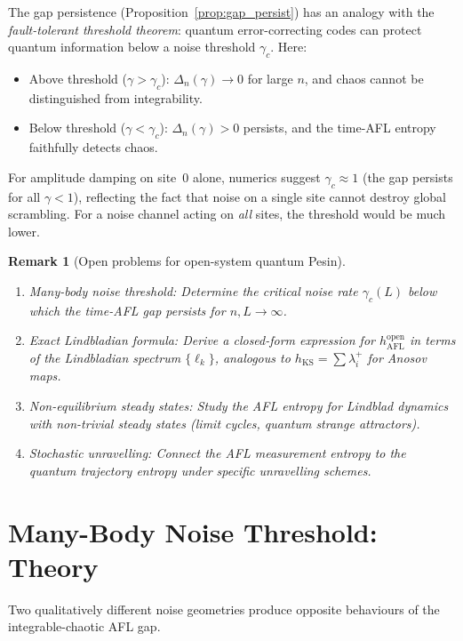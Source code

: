 \documentclass[12pt,a4paper]{article}
\newtheorem{remark}[theorem]{Remark}
\begin{document}
The gap persistence (Proposition~\ref{prop:gap_persist}) has an analogy
with the \emph{fault-tolerant threshold theorem}: quantum error-correcting
codes can protect quantum information below a noise threshold $\gamma_c$.
Here:
\begin{itemize}
\item Above threshold ($\gamma>\gamma_c$): $\Delta_n(\gamma)\to 0$ for large
  $n$, and chaos cannot be distinguished from integrability.
\item Below threshold ($\gamma<\gamma_c$): $\Delta_n(\gamma)>0$ persists,
  and the time-AFL entropy faithfully detects chaos.
\end{itemize}
For amplitude damping on site~$0$ alone, numerics suggest $\gamma_c\approx 1$
(the gap persists for all $\gamma<1$), reflecting the fact that noise on
a single site cannot destroy global scrambling.  For a noise channel acting
on \emph{all} sites, the threshold would be much lower.

\begin{remark}[Open problems for open-system quantum Pesin]
\begin{enumerate}
\item \emph{Many-body noise threshold:} Determine the critical noise rate
  $\gamma_c(L)$ below which the time-AFL gap persists for $n,L\to\infty$.
\item \emph{Exact Lindbladian formula:} Derive a closed-form expression for
  $h_{\mathrm{AFL}}^{\mathrm{open}}$ in terms of the Lindbladian spectrum
  $\{\ell_k\}$, analogous to $h_{\mathrm{KS}}=\sum\lambda_i^+$ for Anosov maps.
\item \emph{Non-equilibrium steady states:} Study the AFL entropy for
  Lindblad dynamics with non-trivial steady states (limit cycles, quantum
  strange attractors).
\item \emph{Stochastic unravelling:} Connect the AFL measurement entropy to
  the quantum trajectory entropy under specific unravelling schemes.
\end{enumerate}
\end{remark}

\section{Many-Body Noise Threshold: Theory}
\label{sec:threshold_theory}

Two qualitatively different noise geometries produce opposite behaviours
of the integrable-chaotic AFL gap.
\end{document}
